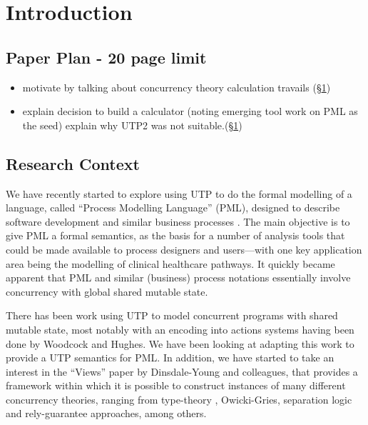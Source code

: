 \section{Introduction}\label{sec:Intro}


\subsection*{Paper Plan - 20 page limit}

\begin{itemize}
  \item motivate by talking about
  concurrency theory calculation travails (\S\ref{sec:Intro})
  \item explain decision to build a calculator
   (noting emerging tool work on PML as the seed)
   explain why UTP2 was not suitable.(\S\ref{sec:Intro})
\end{itemize}


\subsection{Research Context}

We have recently started to explore using UTP
to do the  formal modelling of a language,
called ``Process Modelling Language'' (PML),
designed to describe software development and similar business
processes \cite{DBLP:journals/infsof/AtkinsonWN07}.
The main objective is to give PML a formal semantics,
as the basis for a number of analysis tools that could be made available
to process designers and users---with one key application
area being the modelling of clinical healthcare pathways.
It quickly became apparent that PML and similar (business) process
notations essentially involve concurrency with global shared mutable state.

There has been work using UTP
to model concurrent programs with shared mutable state,
most notably
with an encoding into actions systems having been done by
Woodcock and Hughes\cite{DBLP:conf/icfem/WoodcockH02}.
We have been looking at adapting this work to provide a UTP semantics
for PML.
In addition, we have started to take an interest in the ``Views'' paper
by Dinsdale-Young and colleagues\cite{conf/popl/Dinsdale-YoungBGPY13},
that provides a framework within which it is possible
to construct instances of many different concurrency theories,
ranging from
type-theory \cite{tal-toplas,Smit00b,journals/fuin/AhmedFM07},
Owicki-Gries\cite{Owicki76},
separation logic\cite{conf/lics/CalcagnoOY07}
and rely-guarantee\cite{Jones83}
approaches,
among others.

